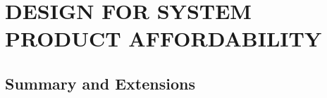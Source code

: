 \chapter{DESIGN FOR SYSTEM PRODUCT AFFORDABILITY}\label{chap:21}


\section{Summary and Extensions}


\begin{exercises}
    \begin{exercise}
    \label{}
    
    \end{exercise}
    \begin{solution}
    \end{solution}

\end{exercises}